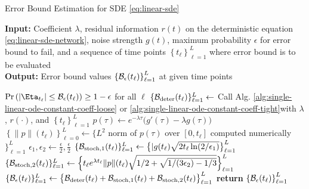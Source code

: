     \makeatletter
    \setlength{\@fptop}{0pt}
    \begin{algorithm}[!htbp]
        \caption{Error Bound Estimation for SDE \eqref{eq:linear-sde}}\label{alg:sde}
        \textbf{Input:} Coefficient $\lambda$, residual information $r(t)$ on the deterministic equation \eqref{eq:linear-sde-network}, noise strength $g(t)$, maximum probability $\epsilon$ for error bound to fail, and a sequence of time points $\left\{t_\ell\right\}_{\ell=1}^{L}$ where error bound is to be evaluated\\
        \textbf{Output:} Error bound values $\left\{\mathcal{B}_\epsilon(t_\ell)\right\}_{\ell=1}^{L}$ at given time points
        \begin{algorithmic}
            \Ensure $\P{\left|\Eta_{t_\ell}\right| \leq \Bound_\epsilon(t_\ell)} \geq 1 - \epsilon$ for all $\ell$
            \State $\{\mathcal{B}_{\text{deter}}(t_\ell)\}_{\ell=1}^{L} \gets $ {\small Call Alg. }\ref{alg:single-linear-ode-constant-coeff-loose} {\small or }\ref{alg:single-linear-ode-constant-coeff-tight}{\small with } $\lambda${\small, }$r(\cdot)${\small, and }$\left\{t_\ell\right\}_{\ell=1}^{L}$
            \State $p(\tau) \gets e^{-\lambda\tau}\big(g'(\tau) - \lambda g(\tau)\big)$
            \State $\left\{\|p\| (t_\ell)\right\}_{\ell=0}^L \gets \{L^2$ {\small norm of} $p(\tau)$ {\small over} $[0, t_\ell]$ {\small computed numerically} $\}_{\ell=1}^{L}$
            \State $\epsilon_1, \epsilon_2 \gets \frac{\epsilon}{2}, \frac{\epsilon}{2}$ 
            \State $\{\mathcal{B}_{\text{stoch}, 1}(t_\ell)\}_{\ell=1}^{L} \gets \big\{|g(t_\ell) \sqrt{2t_\ell \ln(2/\epsilon_1)}\big\}_{\ell=1}^{L}$
            \State $\{\mathcal{B}_{\text{stoch}, 2}(t_\ell)\}_{\ell=1}^{L} \gets \Big\{t_\ell e^{\lambda t_\ell} \|p\|(t_\ell) \sqrt{1/2+ \sqrt{1/(3\epsilon_2) - 1/3}} \Big\}_{\ell=1}^{L}$
            \State $\{\mathcal{B}_{\epsilon}(t_\ell)\}_{\ell=1}^L \gets \big\{ \mathcal{B}_{\text{deter}}(t_\ell) + \mathcal{B}_{\text{stoch}, 1}(t_\ell) + \mathcal{B}_{\text{stoch}, 2}(t_\ell) \big\}_{\ell=1}^{L}$
            \State \textbf{return} $\left\{\mathcal{B}_\epsilon(t_\ell)\right\}_{\ell=1}^{L}$
        \end{algorithmic}
    \end{algorithm}
    \makeatother